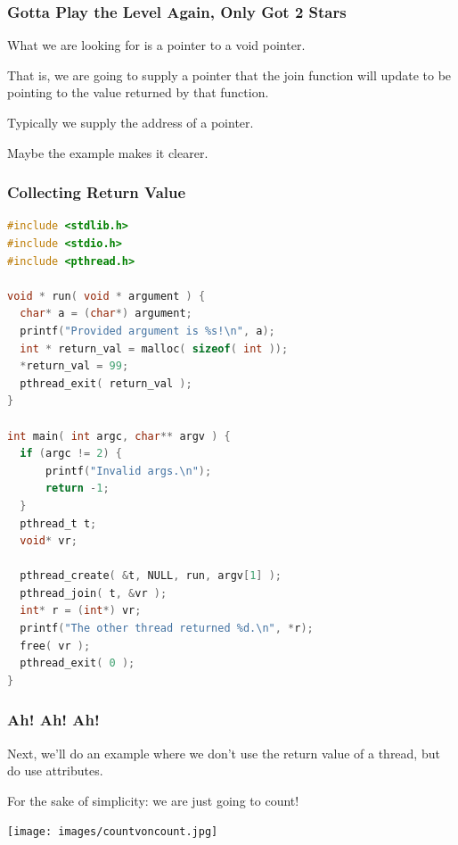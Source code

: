 \begin{frame}
	\frametitle{Gotta Play the Level Again, Only Got 2 Stars}

	What we are looking for is a pointer to a void pointer.

	That is, we are going to supply a pointer that the join function will update to be pointing to the value returned by that function.

	Typically we supply the address of a pointer.

	Maybe the example makes it clearer.
\end{frame}


\begin{frame}[fragile]
	\frametitle{Collecting Return Value}

	\begin{lstlisting}[language=C]
#include <stdlib.h>
#include <stdio.h>
#include <pthread.h>

void * run( void * argument ) { 
  char* a = (char*) argument;
  printf("Provided argument is %s!\n", a); 
  int * return_val = malloc( sizeof( int )); 
  *return_val = 99; 
  pthread_exit( return_val );
}

int main( int argc, char** argv ) { 
  if (argc != 2) {
      printf("Invalid args.\n");
      return -1; 
  }
  pthread_t t;
  void* vr; 
  
  pthread_create( &t, NULL, run, argv[1] );
  pthread_join( t, &vr );
  int* r = (int*) vr; 
  printf("The other thread returned %d.\n", *r);
  free( vr );
  pthread_exit( 0 );
}
\end{lstlisting}


\end{frame}


\begin{frame}
	\frametitle{Ah! Ah! Ah!}

	Next, we'll do an example where we don't use the return value of a thread, but do use attributes.

	For the sake of simplicity: we are just going to count!

	\begin{center}
		\texttt{[image: images/countvoncount.jpg]}
	\end{center}


\end{frame}




